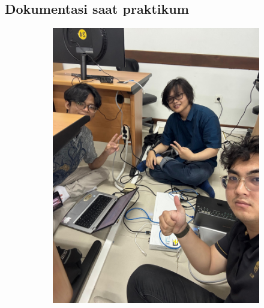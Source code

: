 \subsection{Dokumentasi saat praktikum}
\begin{figure}[H]
	\centering
	\begin{subfigure}[b]{0.4\linewidth}
		\centering
		\includegraphics[width=\linewidth]{P4/img/dokum1.jpg}
	\end{subfigure}
	\begin{subfigure}[b]{0.4\linewidth}
		\centering

\end{subfigure}
\end{figure}
